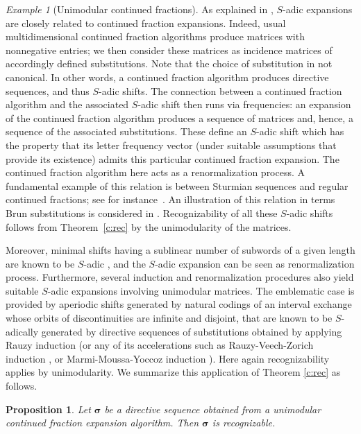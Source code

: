 \documentclass{amsart}
\newtheorem{proposition}[lemma]{Proposition}
\theoremstyle{definition}
\theoremstyle{remark}
\newtheorem{example}[lemma]{Example}
\numberwithin{equation}{section}
\begin{document}
\begin{example}[Unimodular continued fractions]
As explained in \cite{Berthe:11,Berthe-Delecroix,Berthe-Ferenczi-Zamboni:05},   $S$-adic expansions  are closely  related to continued fraction expansions.  
Indeed,  usual 
  multidimensional continued  fraction algorithms  produce  matrices with nonnegative entries;  we  then consider these matrices  as
incidence matrices of accordingly defined substitutions. Note that the choice of substitution in not canonical.
In other words,  a continued fraction algorithm  produces  directive sequences, and thus  $S$-adic  shifts.
The connection between a continued fraction algorithm and the associated $S$-adic shift then runs via frequencies: an expansion of the continued fraction algorithm produces a sequence of matrices and, hence, a sequence of the associated substitutions. These define an $S$-adic shift which has the property that its letter frequency vector (under suitable assumptions that provide its existence) admits this particular continued fraction expansion. The continued fraction algorithm here acts  as a renormalization process.  A fundamental example of this relation is between Sturmian sequences and regular continued fractions; see for instance~\cite{Arnoux-Fisher:01}. An illustration of this relation in terms Brun substitutions is considered in \cite{Berthe-Steiner-Thuswaldner}. Recognizability of all these $S$-adic shifts follows from Theorem~\ref{c:rec} by  the unimodularity of the matrices.

Moreover, minimal  shifts  having a sublinear number of subwords of  a given length
 are known to be $S$-adic \cite{Ferenczi:96},  and the $S$-adic expansion can be seen as  renormalization process.
 Furthermore, several induction and renormalization  procedures also yield suitable  $S$-adic expansions involving  unimodular matrices. The emblematic case is provided by aperiodic shifts generated by natural codings of an interval exchange whose orbits of discontinuities are infinite and disjoint, that are known 
to be $S$-adically generated by  directive  sequences of substitutions obtained   by applying Rauzy induction  (or any of its accelerations such as Rauzy-Veech-Zorich induction \cite{Zorich}, or  Marmi-Moussa-Yoccoz induction \cite{MarMouYoc}). Here again recognizability applies by unimodularity. We summarize this application of Theorem \ref{c:rec}  as follows.
\end{example}

\begin{proposition}
Let $\boldsymbol{\sigma}$ be a directive sequence obtained from a unimodular continued fraction expansion algorithm. 
Then $\boldsymbol{\sigma}$ is recognizable.
\end{proposition}
\end{document}
